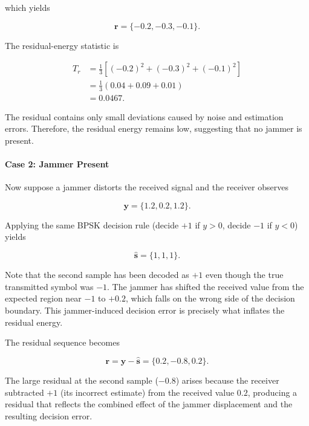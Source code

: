 \documentclass{article}
\begin{document}
which yields

\begin{equation}
\mathbf{r}
=
\{-0.2,-0.3,-0.1\}.
\end{equation}

The residual-energy statistic is

\begin{align}
T_r
&=
\frac{1}{3}
\left[
(-0.2)^2+(-0.3)^2+(-0.1)^2
\right] \\
&=
\frac{1}{3}
\left(
0.04+0.09+0.01
\right) \\
&=
0.0467.
\end{align}

The residual contains only small deviations caused by noise and estimation errors. Therefore, the residual energy remains low, suggesting that no jammer is present.

\paragraph{Case 2: Jammer Present}

Now suppose a jammer distorts the received signal and the receiver observes

\begin{equation}
\mathbf{y}
=
\{1.2,0.2,1.2\}.
\end{equation}

Applying the same BPSK decision rule (decide $+1$ if $y > 0$, decide $-1$ if $y < 0$) yields

\begin{equation}
\hat{\mathbf{s}}
=
\{1,1,1\}.
\end{equation}

Note that the second sample has been decoded as $+1$ even though the true transmitted symbol was $-1$. The jammer has shifted the received value from the expected region near $-1$ to $+0.2$, which falls on the wrong side of the decision boundary. This jammer-induced decision error is precisely what inflates the residual energy.

The residual sequence becomes

\begin{equation}
\mathbf{r}
=
\mathbf{y}
-
\hat{\mathbf{s}}
=
\{0.2,-0.8,0.2\}.
\end{equation}

The large residual at the second sample ($-0.8$) arises because the receiver subtracted $+1$ (its incorrect estimate) from the received value $0.2$, producing a residual that reflects the combined effect of the jammer displacement and the resulting decision error.
\end{document}
